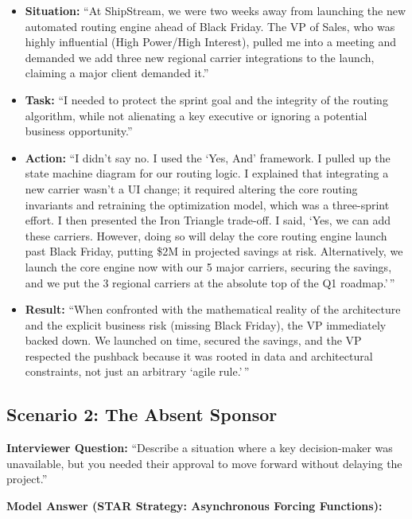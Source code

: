 \begin{itemize}
\tightlist
\item
  \textbf{Situation:} ``At ShipStream, we were two weeks away from
  launching the new automated routing engine ahead of Black Friday. The
  VP of Sales, who was highly influential (High Power/High Interest),
  pulled me into a meeting and demanded we add three new regional
  carrier integrations to the launch, claiming a major client demanded
  it.''
\item
  \textbf{Task:} ``I needed to protect the sprint goal and the integrity
  of the routing algorithm, while not alienating a key executive or
  ignoring a potential business opportunity.''
\item
  \textbf{Action:} ``I didn't say no. I used the `Yes, And' framework. I
  pulled up the state machine diagram for our routing logic. I explained
  that integrating a new carrier wasn't a UI change; it required
  altering the core routing invariants and retraining the optimization
  model, which was a three-sprint effort. I then presented the Iron
  Triangle trade-off. I said, `Yes, we can add these carriers. However,
  doing so will delay the core routing engine launch past Black Friday,
  putting \$2M in projected savings at risk. Alternatively, we launch
  the core engine now with our 5 major carriers, securing the savings,
  and we put the 3 regional carriers at the absolute top of the Q1
  roadmap.'\,''
\item
  \textbf{Result:} ``When confronted with the mathematical reality of
  the architecture and the explicit business risk (missing Black
  Friday), the VP immediately backed down. We launched on time, secured
  the savings, and the VP respected the pushback because it was rooted
  in data and architectural constraints, not just an arbitrary `agile
  rule.'\,''
\end{itemize}

\subsection{Scenario 2: The Absent
Sponsor}\label{scenario-2-the-absent-sponsor}

\textbf{Interviewer Question:} ``Describe a situation where a key
decision-maker was unavailable, but you needed their approval to move
forward without delaying the project.''

\textbf{Model Answer (STAR Strategy: Asynchronous Forcing Functions):}

